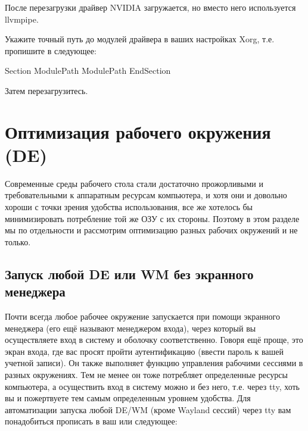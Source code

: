 \documentclass[letterpaper,10pt,russian,openany]{sphinxmanual}
\begin{document}
\sphinxAtStartPar
{} После перезагрузки драйвер NVIDIA загружается, но вместо него используется llvmpipe.

\sphinxAtStartPar
{} Укажите точный путь до модулей драйвера в ваших настройках Xorg, т.е. пропишите в  следующее:

\begin{sphinxVerbatim}[commandchars=\\\{\}]
Section 
  ModulePath 
  ModulePath 
EndSection
\end{sphinxVerbatim}

\sphinxAtStartPar
Затем перезагрузитесь.

\sphinxstepscope


\chapter{Оптимизация рабочего окружения (DE)}
\label{\detokenize{source/de-optimizations:de}}\label{\detokenize{source/de-optimizations:de-optimizations}}\label{\detokenize{source/de-optimizations::doc}}
\sphinxAtStartPar
Современные среды рабочего стола стали достаточно прожорливыми и требовательными к аппаратным ресурсам компьютера,
и хотя они и довольно хороши с точки зрения удобства использования,
все же хотелось бы минимизировать потребление той же ОЗУ с их стороны.
Поэтому в этом разделе мы по отдельности и рассмотрим оптимизацию разных рабочих окружений и не только.

\ignorespaces 

\section{Запуск любой DE или WM без экранного менеджера }
\label{\detokenize{source/de-optimizations:de-wm-x11}}\label{\detokenize{source/de-optimizations:launch-without-display-manager}}\label{\detokenize{source/de-optimizations:index-0}}
\sphinxAtStartPar
Почти всегда любое рабочее окружение запускается при помощи экранного менеджера (его ещё называют менеджером входа),
через который вы осуществляете вход в систему и оболочку соответственно.
Говоря ещё проще, это экран входа, где вас  просят пройти аутентификацию (ввести пароль к вашей учетной записи).
Он также выполняет функцию  управления рабочими сессиями в разных окружениях.
Тем не менее он тоже потребляет определенные ресурсы компьютера, а осуществить вход в систему можно и без него,
т.е. через tty, хоть вы и пожертвуете тем самым определенным уровнем удобства.
Для автоматизации запуска любой DE/WM (кроме Wayland сессий) через tty вам понадобиться прописать в ваш  или  следующее:
\end{document}

